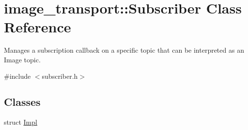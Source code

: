 \hypertarget{classimage__transport_1_1_subscriber}{\section{image\-\_\-transport\-:\-:Subscriber Class Reference}
\label{classimage__transport_1_1_subscriber}
}


Manages a subscription callback on a specific topic that can be interpreted as an Image topic.  




{\ttfamily \#include $<$subscriber.\-h$>$}

\subsection*{Classes}
\begin{DoxyCompactItemize}
\item 
struct \hyperlink{structimage__transport_1_1_subscriber_1_1_impl}{Impl}
\end{DoxyCompactItemize}
